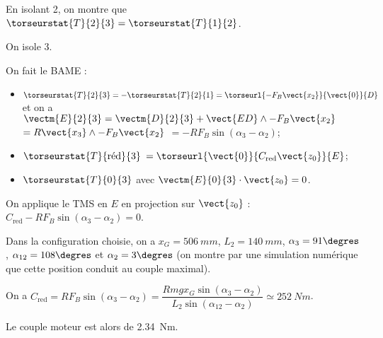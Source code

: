 \ifprof
\begin{corrige}
En isolant 2, on montre que $\torseurstat{T}{2}{3}=\torseurstat{T}{1}{2}$. 

On isole 3. 

On fait le BAME :
\begin{itemize}
\item $\torseurstat{T}{2}{3}=-\torseurstat{T}{2}{1}=\torseurl{ -F_B\vect{x_{2}}}{\vect{0}}{D}$ et on a $\vectm{E}{2}{3} = \vectm{D}{2}{3} + \vect{ED}\wedge -F_B\vect{x_{2}}$ $=R\vect{x_3}\wedge -F_B\vect{x_{2}}$ $=-RF_B \sin\left( \alpha_3- \alpha_2\right)$;
\item $\torseurstat{T}{\text{réd}}{3}$ $ = \torseurl{ \vect{0}}{C_{\text{red}}\vect{z_0}}{E}$;
\item $\torseurstat{T}{0}{3}$ avec $\vectm{E}{0}{3}\cdot \vect{z_0} = 0$.
\end{itemize}
On applique le TMS en $E$ en projection sur $\vect{z_0}$ : $C_{\text{red}}-RF_B \sin \left( \alpha_3 - \alpha_2\right) = 0$.
\end{corrige}
\else
\fi

Dans la configuration choisie, on a $x_G=\SI{506}{mm}$, $L_2 = \SI{140}{mm}$, $\alpha_3=91\degres$, $\alpha_{12}=108\degres$  et $\alpha_2=3\degres$ (on montre par une simulation numérique que cette position conduit au couple maximal).

\ifnormal
{}
\else
\fi

\ifprof
\begin{corrige}
On a $C_{\text{red}}=RF_B \sin \left( \alpha_3 - \alpha_2\right) =\dfrac{ Rmgx_G \sin \left( \alpha_3 - \alpha_2\right)}{L_2  \sin  \left(\alpha_{12}-\alpha_2\right)} \simeq \SI{252}{Nm}$.
\end{corrige}
\else
\fi

\ifprof
\begin{corrige}
Le couple moteur est alors de \SI{2,34}{Nm}.
\end{corrige}
\else
\fi




